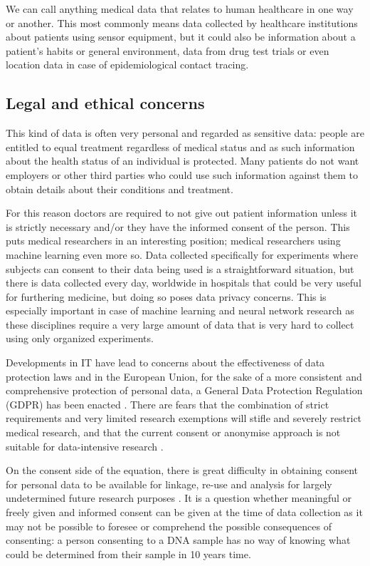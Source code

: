 	We can call anything medical data that relates to human healthcare in one way or another. This most commonly means data collected by healthcare institutions about patients using sensor equipment, but it could also be information about a patient's habits or general environment, data from drug test trials or even location data in case of epidemiological contact tracing. 
	
	\subsection{Legal and ethical concerns}
	\label{sec:legal}
	
	This kind of data is often very personal and regarded as sensitive data: people are entitled to equal treatment regardless of medical status and as such information about the health status of an individual is protected. Many patients do not want employers or other third parties who could use such information against them to obtain details about their conditions and treatment.
	
	For this reason doctors are required to not give out patient information unless it is strictly necessary and/or they have the informed consent of the person. This puts medical researchers in an interesting position; medical researchers using machine learning even more so. Data collected specifically for experiments where subjects can consent to their data being used is a straightforward situation, but there is data collected every day, worldwide in hospitals that could be very useful for furthering medicine, but doing so poses data privacy concerns. This is especially important in case of machine learning and neural network research as these disciplines require a very large amount of data that is very hard to collect using only organized experiments.
	
	Developments in IT have lead to concerns about the effectiveness of data protection laws and in the European Union, for the sake of a more consistent and comprehensive protection of personal data, a General Data Protection Regulation (GDPR) has been enacted \cite{GDPR2016a}. There are fears that the combination of strict requirements and very limited research exemptions will stifle and severely restrict medical research, and that the current consent or anonymise approach is not suitable for data-intensive research \cite{mostert2016big}. 
	
	On the consent side of the equation, there is great difficulty in obtaining consent for personal data to be available for linkage, re-use and analysis for largely undetermined future research purposes \cite{anderson2015collection}. It is a question whether meaningful or freely given and informed consent can be given at the time of data collection as it may not be possible to foresee or comprehend the possible consequences of consenting: a person consenting to a DNA sample has no way of knowing what could be determined from their sample in 10 years time.
	
